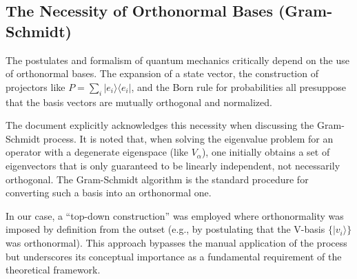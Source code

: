 \documentclass[11pt,a4paper]{article}
\begin{document}
  \subsection{The Necessity of Orthonormal Bases (Gram-Schmidt)}
  The postulates and formalism of quantum mechanics critically depend on the use
  of orthonormal bases. The expansion of a state vector, the
  construction of projectors like $P = \sum_i |e_i\rangle\langle e_i|$, and the
  Born rule for probabilities all presuppose that the basis vectors are mutually
  orthogonal and normalized.

  The document explicitly acknowledges this necessity when discussing the
  Gram-Schmidt process. It is noted that, when solving the eigenvalue
  problem for an operator with a degenerate eigenspace (like $V_{\alpha}$), one
  initially obtains a set of eigenvectors that is only guaranteed to be linearly
  independent, not necessarily orthogonal. The Gram-Schmidt algorithm is the
  standard procedure for converting such a basis into an orthonormal one.

  In our case, a ``top-down construction'' was employed where orthonormality was
  imposed by definition from the outset (e.g., by postulating that the V-basis
  $\{|v_i\rangle\}$ was orthonormal). This approach bypasses the manual
  application of the process but underscores its conceptual importance as a
  fundamental requirement of the theoretical framework.
\end{document}
